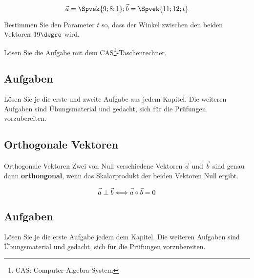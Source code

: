 $$\vec{a} = \Spvek{9;8;1}; \vec{b} = \Spvek{11;12;t}$$

Bestimmen Sie den Parameter $t$ so, dass der Winkel zwischen den
beiden Vektoren $19\degre$ wird.

Lösen Sie die Aufgabe mit dem CAS\footnote{CAS: Computer-Algebra-System}-Taschenrechner.



  
  
  \newpage
  
  \subsection*{Aufgaben}

Lösen Sie je die erste und zweite Aufgabe aus jedem Kapitel. Die weiteren Aufgaben
sind Übungsmaterial und gedacht, sich für die Prüfungen vorzubereiten.




\newpage

\subsection{Orthogonale Vektoren}

\begin{gesetz}{Orthogonale Vektoren}{}
  Zwei von Null verschiedene Vektoren $\vec{a}$ und $\vec{b}$ sind genau dann
  \textbf{orthongonal}, wenn das Skalarprodukt der beiden Vektoren
  Null ergibt.


  $$\vec{\vphantom{b}a} \perp \vec{b} \Longleftrightarrow
  \vec{\vphantom{b}a}\circ{}\vec{b} = 0$$
\end{gesetz}

\subsection*{Aufgaben}

Lösen Sie je die erste Aufgabe jedem dem Kapitel. Die weiteren Aufgaben
sind Übungsmaterial und gedacht, sich für die Prüfungen vorzubereiten.

